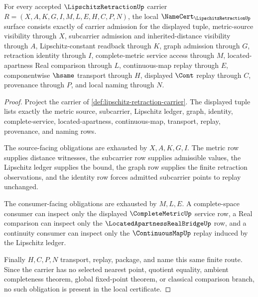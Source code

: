 \begin{theorem}
\label{thm:lipschitz-retraction-namecert-obligations}
For every accepted $\LipschitzRetractionUp$ carrier $R=(X,A,K,G,I,M,L,E,H,C,P,N)$, the local $\NameCert_{\LipschitzRetractionUp}$ surface consists exactly of carrier admission for the displayed tuple, metric-source visibility through $X$, subcarrier admission and inherited-distance visibility through $A$, Lipschitz-constant readback through $K$, graph admission through $G$, retraction identity through $I$, complete-metric service access through $M$, located-apartness Real comparison through $L$, continuous-map replay through $E$, componentwise $\hsame$ transport through $H$, displayed $\Cont$ replay through $C$, provenance through $P$, and local naming through $N$.
\end{theorem}
\begin{proof}
Project the carrier of \autoref{def:lipschitz-retraction-carrier}. The displayed tuple lists exactly the metric source, subcarrier, Lipschitz ledger, graph, identity, complete-service, located-apartness, continuous-map, transport, replay, provenance, and naming rows.

The source-facing obligations are exhausted by $X,A,K,G,I$. The metric row supplies distance witnesses, the subcarrier row supplies admissible values, the Lipschitz ledger supplies the bound, the graph row supplies the finite retraction observations, and the identity row forces admitted subcarrier points to replay unchanged.

The consumer-facing obligations are exhausted by $M,L,E$. A complete-space consumer can inspect only the displayed $\CompleteMetricUp$ service row, a Real comparison can inspect only the $\LocatedApartnessRealBridgeUp$ row, and a continuity consumer can inspect only the $\ContinuousMapUp$ replay induced by the Lipschitz ledger.

Finally $H,C,P,N$ transport, replay, package, and name this same finite route. Since the carrier has no selected nearest point, quotient equality, ambient completeness theorem, global fixed-point theorem, or classical comparison branch, no such obligation is present in the local certificate.
\end{proof}

